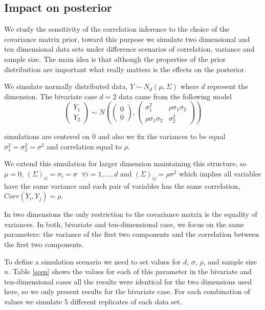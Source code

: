 \documentclass[a4paper]{article}
\begin{document}
\subsection{Impact on posterior} 

We study the sensitivity of the correlation inference to the choice of the covariance matrix prior, toward this purpose we simulate two dimensional and ten dimensional data sets under difference scenarios of correlation, variance and sample size. The main idea is that although the properties of the prior distribution are important what really matters is the effects on the posterior.

We simulate normally distributed data, $Y \sim N_d(\mu, \Sigma) $ where $d$ represent the dimension. The bivariate case $d=2$ data came from the following model 
\begin{equation}
\begin{pmatrix}  Y_1 \\ Y_2 \end{pmatrix} \sim 
N\left( \begin{pmatrix}  0 \\ 0 \end{pmatrix}, \begin{pmatrix}  \sigma_{1}^2 & \rho\sigma_{1}\sigma_{2} \\ \rho\sigma_{1}\sigma_{2} & \sigma_{2}^2 \end{pmatrix} \right)
\label{modsim}
\end{equation} 

simulations are centered on 0 and also we fix the variances to be equal $\sigma_{1}^2=\sigma_{2}^2=\sigma^2$ and correlation equal to $\rho$. 

We extend this simulation for larger dimension maintaining this structure, so $\mu= 0$, $(\Sigma)_{ii} = \sigma_{i}=\sigma \;\; \forall i=1,\ldots,d$ and $(\Sigma)_{ij} = \rho\sigma^2$ which implies all variables have the same variance and each pair of variables has the same correlation, $Corr(Y_{i}, Y_{j}) = \rho$. 

In two dimensions the only restriction to the covariance matrix is the equality of variances. In both, bivariate and ten-dimensional case, we focus on the same parameters: the variance of the first two components and the correlation between the first two components. 

To define a simulation scenario we need to set values for $d$, $\sigma$, $\rho$, and sample size $n$. Table \ref{scen} shows the values for each of this parameter in the bivariate and ten-dimensional cases all the results were identical for the two dimensions used here, so we only present results for the bivariate case. For each combination of values we simulate 5 different replicates of each data set.  
\end{document}
